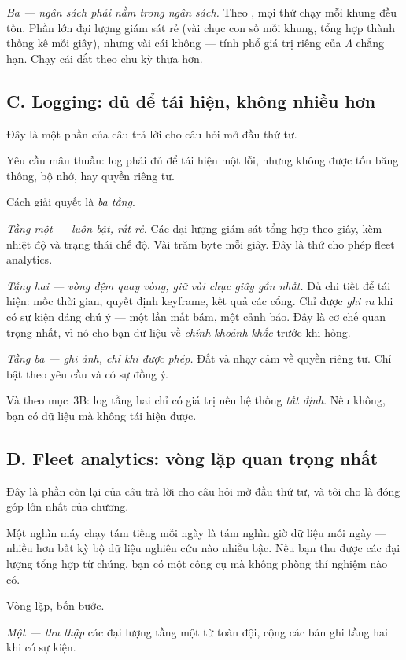 \documentclass[../../vslam.tex]{subfiles}
\begin{document}
\emph{Ba --- ngân sách phải nằm trong ngân sách.} Theo , mọi thứ chạy mỗi khung đều tốn. Phần lớn đại lượng giám sát rẻ (vài chục con số mỗi khung, tổng hợp thành thống kê mỗi giây), nhưng vài cái không --- tính phổ giá trị riêng của \(\Lambda\) chẳng hạn. Chạy cái đắt theo chu kỳ thưa hơn.

\subsection{C. Logging: đủ để tái hiện, không nhiều hơn}

Đây là một phần của câu trả lời cho câu hỏi mở đầu thứ tư.

Yêu cầu mâu thuẫn: log phải đủ để tái hiện một lỗi, nhưng không được tốn băng thông, bộ nhớ, hay quyền riêng tư.

Cách giải quyết là \emph{ba tầng}.

\emph{Tầng một --- luôn bật, rất rẻ.} Các đại lượng giám sát tổng hợp theo giây, kèm nhiệt độ và trạng thái chế độ. Vài trăm byte mỗi giây. Đây là thứ cho phép fleet analytics.

\emph{Tầng hai --- vòng đệm quay vòng, giữ vài chục giây gần nhất.} Đủ chi tiết để tái hiện: mốc thời gian, quyết định keyframe, kết quả các cổng. Chỉ được \emph{ghi ra} khi có sự kiện đáng chú ý --- một lần mất bám, một cảnh báo. Đây là cơ chế quan trọng nhất, vì nó cho bạn dữ liệu về \emph{chính khoảnh khắc} trước khi hỏng.

\emph{Tầng ba --- ghi ảnh, chỉ khi được phép.} Đắt và nhạy cảm về quyền riêng tư. Chỉ bật theo yêu cầu và có sự đồng ý.

Và theo  mục~3B: log tầng hai chỉ có giá trị nếu hệ thống \emph{tất định}. Nếu không, bạn có dữ liệu mà không tái hiện được.

\subsection{D. Fleet analytics: vòng lặp quan trọng nhất}

Đây là phần còn lại của câu trả lời cho câu hỏi mở đầu thứ tư, và tôi cho là đóng góp lớn nhất của chương.

Một nghìn máy chạy tám tiếng mỗi ngày là tám nghìn giờ dữ liệu mỗi ngày --- nhiều hơn bất kỳ bộ dữ liệu nghiên cứu nào nhiều bậc. Nếu bạn thu được các đại lượng tổng hợp từ chúng, bạn có một công cụ mà không phòng thí nghiệm nào có.

Vòng lặp, bốn bước.

\emph{Một --- thu thập} các đại lượng tầng một từ toàn đội, cộng các bản ghi tầng hai khi có sự kiện.
\end{document}
